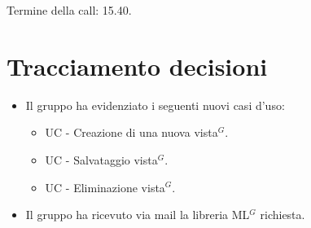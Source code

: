 Termine della call: 15.40.

\section{Tracciamento decisioni}

\begin{itemize}
	\item Il gruppo ha evidenziato i seguenti nuovi casi d'uso:
	\begin{itemize}
		\item UC - Creazione di una nuova vista$^{G}$.
		\item UC - Salvataggio vista$^{G}$.
		\item UC - Eliminazione vista$^{G}$.
	\end{itemize}
	\item Il gruppo ha ricevuto via mail la libreria ML$^{G}$ richiesta.
\end{itemize}